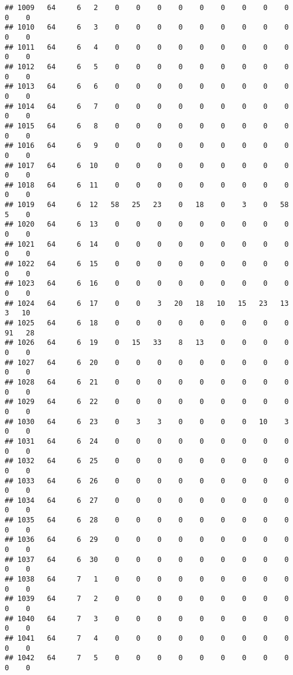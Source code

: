 \documentclass[]{article}
\begin{document}
\begin{verbatim}
## 1009   64     6   2    0    0    0    0    0    0    0    0    0    0    0
## 1010   64     6   3    0    0    0    0    0    0    0    0    0    0    0
## 1011   64     6   4    0    0    0    0    0    0    0    0    0    0    0
## 1012   64     6   5    0    0    0    0    0    0    0    0    0    0    0
## 1013   64     6   6    0    0    0    0    0    0    0    0    0    0    0
## 1014   64     6   7    0    0    0    0    0    0    0    0    0    0    0
## 1015   64     6   8    0    0    0    0    0    0    0    0    0    0    0
## 1016   64     6   9    0    0    0    0    0    0    0    0    0    0    0
## 1017   64     6  10    0    0    0    0    0    0    0    0    0    0    0
## 1018   64     6  11    0    0    0    0    0    0    0    0    0    0    0
## 1019   64     6  12   58   25   23    0   18    0    3    0   58    5    0
## 1020   64     6  13    0    0    0    0    0    0    0    0    0    0    0
## 1021   64     6  14    0    0    0    0    0    0    0    0    0    0    0
## 1022   64     6  15    0    0    0    0    0    0    0    0    0    0    0
## 1023   64     6  16    0    0    0    0    0    0    0    0    0    0    0
## 1024   64     6  17    0    0    3   20   18   10   15   23   13    3   10
## 1025   64     6  18    0    0    0    0    0    0    0    0    0   91   28
## 1026   64     6  19    0   15   33    8   13    0    0    0    0    0    0
## 1027   64     6  20    0    0    0    0    0    0    0    0    0    0    0
## 1028   64     6  21    0    0    0    0    0    0    0    0    0    0    0
## 1029   64     6  22    0    0    0    0    0    0    0    0    0    0    0
## 1030   64     6  23    0    3    3    0    0    0    0   10    3    0    0
## 1031   64     6  24    0    0    0    0    0    0    0    0    0    0    0
## 1032   64     6  25    0    0    0    0    0    0    0    0    0    0    0
## 1033   64     6  26    0    0    0    0    0    0    0    0    0    0    0
## 1034   64     6  27    0    0    0    0    0    0    0    0    0    0    0
## 1035   64     6  28    0    0    0    0    0    0    0    0    0    0    0
## 1036   64     6  29    0    0    0    0    0    0    0    0    0    0    0
## 1037   64     6  30    0    0    0    0    0    0    0    0    0    0    0
## 1038   64     7   1    0    0    0    0    0    0    0    0    0    0    0
## 1039   64     7   2    0    0    0    0    0    0    0    0    0    0    0
## 1040   64     7   3    0    0    0    0    0    0    0    0    0    0    0
## 1041   64     7   4    0    0    0    0    0    0    0    0    0    0    0
## 1042   64     7   5    0    0    0    0    0    0    0    0    0    0    0

\end{verbatim}
\end{document}
